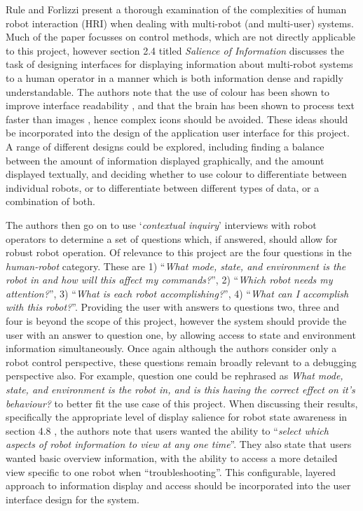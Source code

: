 Rule and Forlizzi \cite{Rule:2012} present a thorough examination of the complexities of human robot interaction (HRI) when dealing with multi-robot (and multi-user) systems. Much of the paper focusses on control methods, which are not directly applicable to this project, however section 2.4 titled \textit{Salience of Information} discusses the task of designing interfaces for displaying information about multi-robot systems to a human operator in a manner which is both information dense and rapidly understandable. The authors note that the use of colour has been shown to improve interface readability \cite{Christ:1984}, and that the brain has been shown to process text faster than images \cite{Carney:1998}, hence complex icons should be avoided. These ideas should be incorporated into the design of the application user interface for this project. A range of different designs could be explored, including finding a balance between the amount of information displayed graphically, and the amount displayed textually, and deciding whether to use colour to differentiate between individual robots, or to differentiate between different types of data, or a combination of both.

The authors \cite{Rule:2012} then go on to use `\textit{contextual inquiry}' interviews with robot operators to determine a set of questions which, if answered, should allow for robust robot operation. Of relevance to this project are the four questions in the \textit{human-robot} category. These are 1) ``\textit{What mode, state, and environment is the robot in and how will this affect my commands?}'', 2) ``\textit{Which robot needs my attention?}'', 3) ``\textit{What is each robot accomplishing?}'', 4) ``\textit{What can I accomplish with this robot?}''. Providing the user with answers to questions two, three and four is beyond the scope of this project, however the system should provide the user with an answer to question one, by allowing access to state and environment information simultaneously. Once again although the authors \cite{Rule:2012} consider only a robot control perspective, these questions remain broadly relevant to a debugging perspective also. For example, question one could be rephrased as \textit{What mode, state, and environment is the robot in, and is this having the correct effect on it's behaviour?} to better fit the use case of this project. When discussing their results, specifically the appropriate level of display salience for robot state awareness in section 4.8 \cite{Rule:2012}, the authors note that users wanted the ability to ``\textit{select which aspects of robot information to view at any one time}''. They also state that users wanted basic overview information, with the ability to access a more detailed view specific to one robot when ``troubleshooting''. This configurable, layered approach to information display and access should be incorporated into the user interface design for the system.

